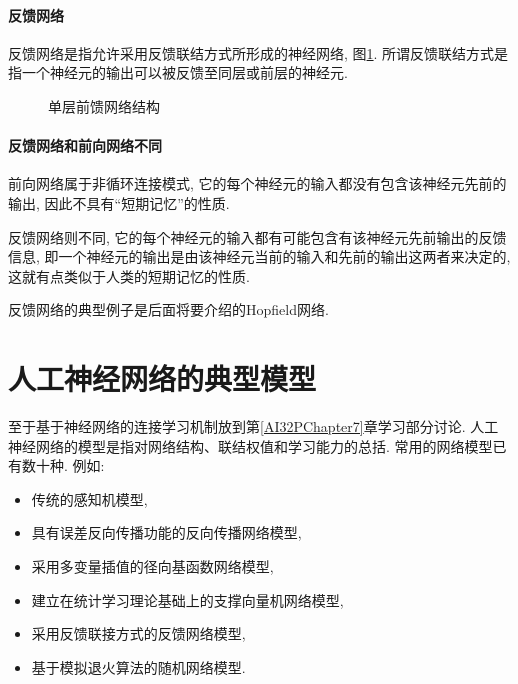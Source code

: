\paragraph{反馈网络}
反馈网络是指允许采用反馈联结方式所形成的神经网络, 图\ref{AI32fig1202205}. 所谓反馈联结方式是指一个神经元的输出可以被反馈至同层或前层的神经元.
\begin{figure}[H]
\begin{center}
\caption{单层前馈网络结构}
\label{AI32fig1202205}
\end{center}
\end{figure}
\paragraph{反馈网络和前向网络不同}
前向网络属于非循环连接模式, 它的每个神经元的输入都没有包含该神经元先前的输出, 因此不具有“短期记忆”的性质.

反馈网络则不同, 它的每个神经元的输入都有可能包含有该神经元先前输出的反馈信息, 即一个神经元的输出是由该神经元当前的输入和先前的输出这两者来决定的, 这就有点类似于人类的短期记忆的性质.

反馈网络的典型例子是后面将要介绍的Hopfield网络.
\section{人工神经网络的典型模型}
至于基于神经网络的连接学习机制放到第\ref{AI32PChapter7}章学习部分讨论. 人工神经网络的模型是指对网络结构、联结权值和学习能力的总括. 常用的网络模型已有数十种. 例如:
\begin{itemize}
\item 传统的感知机模型,
\item 具有误差反向传播功能的反向传播网络模型,
\item 采用多变量插值的径向基函数网络模型,
\item 建立在统计学习理论基础上的支撑向量机网络模型,
\item 采用反馈联接方式的反馈网络模型,
\item 基于模拟退火算法的随机网络模型.
\end{itemize}
